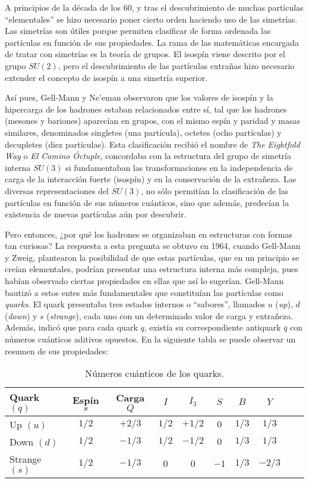 A principios de la década de los 60, y tras el descubrimiento de muchas partículas ``elementales'' se hizo necesario poner cierto orden haciendo uso de las simetrías. Las simetrías son útiles porque permiten clasificar de forma ordenada las partículas en función de sus propiedades. La rama de las matemáticas encargada de tratar con simetrías es la teoría de grupos. El isospín viene descrito por el grupo $SU(2)$, pero el descubrimiento de las partículas extrañas hizo necesario extender el concepto de isospín a una simetría superior.

Así pues, Gell-Mann y Ne'eman observaron que los valores de isospín y la hipercarga de los hadrones estaban relacionados entre sí, tal que los hadrones (mesones y bariones) aparecían en grupos, con el mismo espín y paridad y masas similares, denominados singletes (una partícula), octetes (ocho partículas) y decupletes (diez partículas).  Esta clasificación recibió el nombre de \textit{The Eightfold Way} o \textit{El Camino Óctuple}, concordaba con la estructura del grupo de simetría interna $SU(3)$ si fundamentaban las transformaciones en la independencia de carga de la interacción fuerte (isospín) y en la conservación de la extrañeza.\cite{notas2020} Las diversas representaciones del $SU(3)$, no sólo permitían la clasificación de las partículas en función de sus números cuánticos, sino que además, predecían la existencia de nuevas partículas aún por descubrir. 

Pero entonces, ¿por qué los hadrones se organizaban en estructuras con formas tan curiosas? La respuesta a esta pregunta se obtuvo en 1964, cuando Gell-Mann y Zweig, plantearon la posibilidad de que estas partículas, que en un principio se creían elementales, podrían presentar una estructura interna más compleja, pues habían observado ciertas propiedades en ellas que así lo sugerían. Gell-Mann bautizó a estos entes más fundamentales que constituían las partículas como \textit{quarks}.\cite{Griffiths2008} El quark presentaba tres estados internos o ``sabores'', llamados $u$ (\textit{up}), $d$ (\textit{down}) y $s$ (\textit{strange}), cada uno con un determinado valor de carga y extrañeza. Además, indicó que para cada quark $q$, existía su correspondiente antiquark $\overline{q}$ con números cuánticos aditivos opuestos. En la siguiente tabla se puede observar un resumen de sus propiedades:

\begin{table}[h]
	\centering
	\begin{tabular}{l*{8}{c}r}
\hline
Quark $(q)$ & Espín $s$ & Carga $Q$ & $I$ & $I_3$ & $S$ & $B$ & $Y$\\ 
\hline
Up $(u)$ & $1/2$ & $+2/3$ & $1/2$ & $+1/2$ & $0$ & $1/3$ & $1/3$\\
Down $(d)$ & $1/2$ & $-1/3$ & $1/2$ & $-1/2$ & $0$ & $1/3$ & $1/3$\\
Strange $(s)$ & $1/2$ & $-1/3$ & $0$ & $0$ & $-1$ & $1/3$ & $-2/3$\\
\hline
	\end{tabular}
\caption{Números cuánticos de los quarks. \cite{notas2020}} %
\label{tab:propiedades_quarks}
\end{table}

